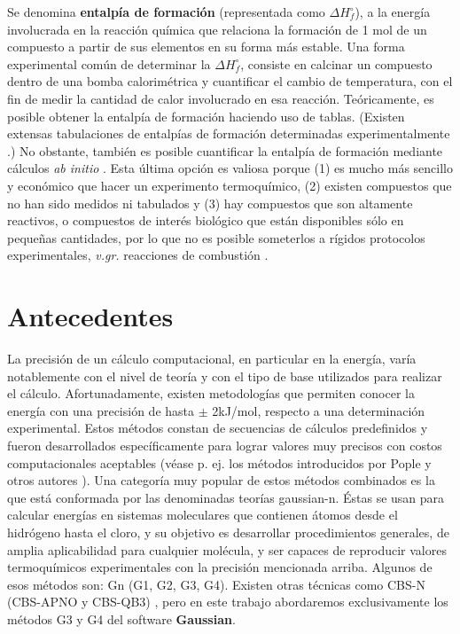 \documentclass[12pt]{article}
\begin{document}
Se denomina \textbf{entalpía de formación} (representada como $\Delta H_{f}^{\circ}$), a la energía
involucrada en la reacción química que relaciona la formación de 1 mol de un compuesto a partir de sus elementos en su forma más estable.
Una forma experimental común de determinar la $\Delta H_{f}^{\circ}$, consiste en calcinar un compuesto dentro de una bomba calorimétrica y cuantificar el cambio de temperatura,
con el fin de medir la cantidad de calor involucrado en esa reacción. Teóricamente, es posible obtener la entalpía de formación haciendo uso de tablas. (Existen extensas tabulaciones de entalpías de formación determinadas experimentalmente  \cite{NIST1998, Tajti2004}.) No obstante, también es posible cuantificar la entalpía de formación mediante cálculos \textit{ab initio}  \cite{Lewars2016}.
Esta última opción es valiosa porque (1) es mucho más sencillo y económico que hacer un experimento termoquímico, (2) existen compuestos que no han sido medidos ni tabulados y (3) hay compuestos que son altamente reactivos, o compuestos de interés biológico que están disponibles sólo en pequeñas cantidades, por lo que no es posible someterlos a rígidos protocolos experimentales, \textit{v.gr.} reacciones de combustión  \cite{Lewars2016}.

\section*{Antecedentes}
La precisión de un cálculo computacional, en particular en la energía, varía notablemente con el nivel de teoría y con el tipo de base utilizados para realizar el cálculo.
Afortunadamente, existen metodologías que permiten conocer la energía con una precisión de
hasta $\pm$ 2kJ/mol, respecto a una determinación experimental. Estos métodos constan de secuencias
de cálculos predefinidos y fueron desarrollados específicamente para lograr valores muy precisos
con costos computacionales aceptables (véase p. ej. los métodos introducidos por Pople y otros
autores  \cite{Cuevas2003}). Una categoría muy popular de estos métodos combinados es la que está
conformada por las denominadas teorías gaussian-n.
Éstas se usan para calcular energías en sistemas moleculares que contienen átomos desde
el hidrógeno hasta el cloro, y su objetivo es desarrollar procedimientos generales,
de amplia aplicabilidad para cualquier molécula, y ser capaces de reproducir valores
termoquímicos experimentales con la precisión mencionada arriba.
Algunos de esos métodos son: Gn (G1, G2, G3, G4).  Existen otras técnicas como CBS-N
(CBS-APNO y CBS-QB3)  \cite{Simmie2015}, pero en este trabajo abordaremos exclusivamente
los métodos G3 y G4 del software \textbf{Gaussian}.
\end{document}
